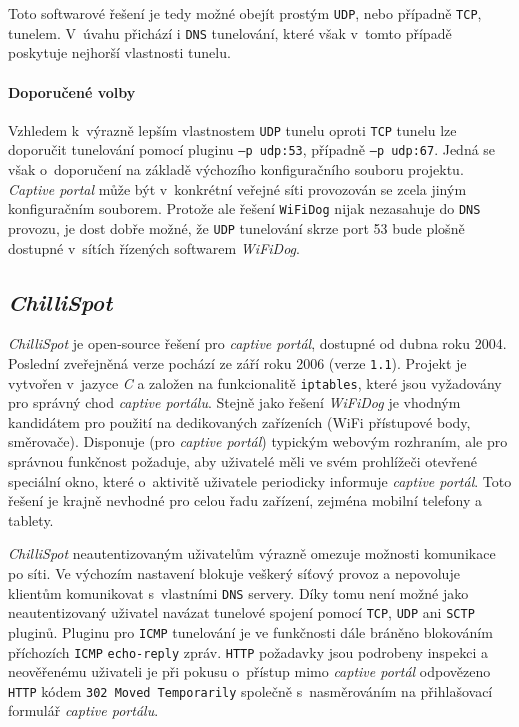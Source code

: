 \documentclass[thesis=M,czech]{FITthesis}[2012/10/20]
\begin{document}
Toto softwarové řešení je tedy možné obejít prostým \texttt{UDP}, nebo případně \texttt{TCP}, tunelem. V~úvahu přichází i \texttt{DNS} tunelování, které však v~tomto případě poskytuje nejhorší vlastnosti tunelu.


\paragraph{Doporučené volby} Vzhledem k~výrazně lepším vlastnostem \texttt{UDP} tunelu oproti \texttt{TCP} tunelu lze doporučit tunelování pomocí pluginu \texttt{--p udp:53}, případně \texttt{--p udp:67}. Jedná se však o~doporučení na základě výchozího konfiguračního souboru projektu. \textit{Captive portal} může být v~konkrétní veřejné síti provozován se zcela jiným konfiguračním souborem. Protože ale řešení \texttt{WiFiDog} nijak nezasahuje do \texttt{DNS} provozu, je dost dobře možné, že \texttt{UDP} tunelování skrze port 53 bude plošně dostupné v~sítích řízených softwarem \textit{WiFiDog}.


\subsection{\textit{ChilliSpot}}

\textit{ChilliSpot} je open-source řešení pro \textit{captive portál}, dostupné od dubna roku 2004. Poslední zveřejněná verze pochází ze září roku 2006 (verze \texttt{1.1}). Projekt je vytvořen v~jazyce \textit{C} a založen na funkcionalitě \texttt{iptables}, které jsou vyžadovány pro správný chod \textit{captive portálu}. Stejně jako řešení \textit{WiFiDog} je vhodným kandidátem pro použití na dedikovaných zařízeních (WiFi přístupové body, směrovače). Disponuje (pro \textit{captive portál}) typickým webovým rozhraním, ale pro správnou funkčnost požaduje, aby uživatelé měli ve svém prohlížeči otevřené speciální okno, které o~aktivitě uživatele periodicky informuje \textit{captive portál}. Toto řešení je krajně nevhodné pro celou řadu zařízení, zejména mobilní telefony a tablety. 

\textit{ChilliSpot} neautentizovaným uživatelům výrazně omezuje možnosti komunikace po síti. Ve výchozím nastavení blokuje veškerý síťový provoz a nepovoluje klientům komunikovat s~vlastními \texttt{DNS} servery. Díky tomu není možné jako neautentizovaný uživatel navázat tunelové spojení pomocí \texttt{TCP}, \texttt{UDP} ani \texttt{SCTP} pluginů. Pluginu pro \texttt{ICMP} tunelování je ve funkčnosti dále bráněno blokováním příchozích \texttt{ICMP} \texttt{echo-reply} zpráv. \texttt{HTTP} požadavky jsou podrobeny inspekci a neověřenému uživateli je při pokusu o~přístup mimo \textit{captive portál} odpovězeno \texttt{HTTP} kódem \texttt{302 Moved Temporarily} společně s~nasměrováním na přihlašovací formulář \textit{captive portálu}.
\end{document}
